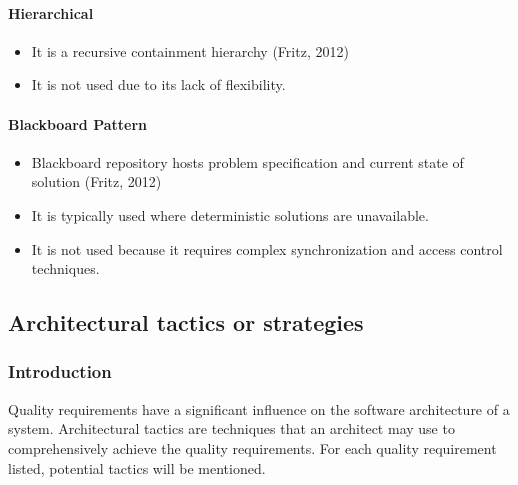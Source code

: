 \documentclass{article}
\begin{document}
\paragraph{Hierarchical}
\begin{itemize}
\item It is a recursive containment hierarchy (Fritz, 2012)
\item It is not used due to its lack of flexibility.
\end{itemize}

\paragraph{Blackboard Pattern}
\begin{itemize}
\item Blackboard repository hosts problem specification and current state of solution (Fritz, 2012)
\item It is typically used where deterministic solutions are unavailable.
\item It is not used because it requires complex synchronization and access control techniques. 
\end{itemize}
			
		\subsection{Architectural tactics or strategies}
			\subsubsection{Introduction}
				Quality requirements have a significant influence on the software architecture of a system. Architectural tactics are techniques that an architect may use to comprehensively achieve the quality requirements. For each quality requirement listed, potential tactics will be mentioned.
			
\end{document}
